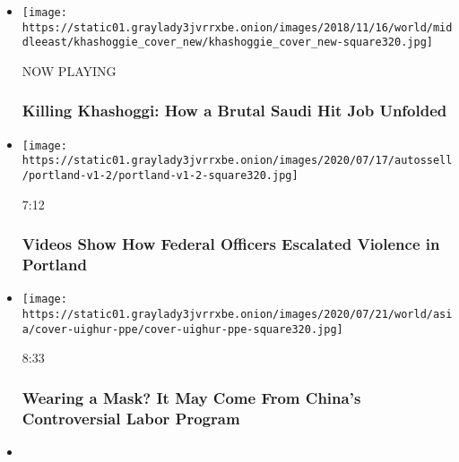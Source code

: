 \begin{itemize}
\item
  \texttt{[image: https://static01.graylady3jvrrxbe.onion/images/2018/11/16/world/middleeast/khashoggie\_cover\_new/khashoggie\_cover\_new-square320.jpg]}

  NOW PLAYING

  \hypertarget{killing-khashoggi-how-a-brutal-saudi-hit-job-unfolded-2}{%
  \subsubsection{Killing Khashoggi: How a Brutal Saudi Hit Job
  Unfolded}\label{killing-khashoggi-how-a-brutal-saudi-hit-job-unfolded-2}}
\item
  \href{https://www.nytimes3xbfgragh.onion/video/us/100000007243995/portland-protests-federal-government.html?action=click\&module=video-series-bar\&region=header\&pgtype=Article\&playlistId=video/investigations}{}

  \texttt{[image: https://static01.graylady3jvrrxbe.onion/images/2020/07/17/autossell/portland-v1-2/portland-v1-2-square320.jpg]}

  7:12

  \hypertarget{videos-show-how-federal-officers-escalated-violence-in-portland}{%
  \subsubsection{Videos Show How Federal Officers Escalated Violence in
  Portland}\label{videos-show-how-federal-officers-escalated-violence-in-portland}}
\item
  \href{https://www.nytimes3xbfgragh.onion/video/world/asia/100000007226041/china-coronavirus-masks-uighur-labor-ppe.html?action=click\&module=video-series-bar\&region=header\&pgtype=Article\&playlistId=video/investigations}{}

  \texttt{[image: https://static01.graylady3jvrrxbe.onion/images/2020/07/21/world/asia/cover-uighur-ppe/cover-uighur-ppe-square320.jpg]}

  8:33

  \hypertarget{wearing-a-mask-it-may-come-from-chinas-controversial-labor-program}{%
  \subsubsection{Wearing a Mask? It May Come From China's Controversial
  Labor
  Program}\label{wearing-a-mask-it-may-come-from-chinas-controversial-labor-program}}
\item
  \href{https://www.nytimes3xbfgragh.onion/video/us/100000007122997/ice-deportations-coronavirus-video.html?action=click\&module=video-series-bar\&region=header\&pgtype=Article\&playlistId=video/investigations}{}


\end{itemize}
